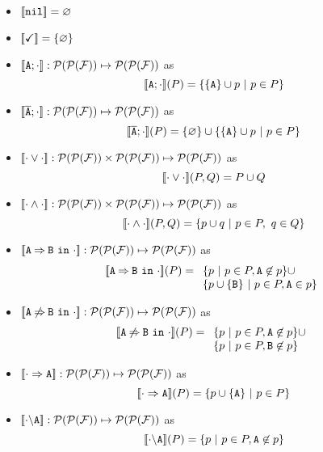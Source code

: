 \begin{itemize}
	\item $[\![\mathtt{nil}]\!]=\varnothing$
	\item $[\![\checkmark]\!]=\{\varnothing\}$
	\item 
	$[\![\mathtt{A};\cdot]\!]:{\cal P}({\cal P}({\cal F}))\mapsto{\cal P}({\cal P}({\cal F}))$
	as
	$$[\![\mathtt{A};\cdot]\!](P)=\{\{\mathtt{A}\}\cup p\ |\ p\in
	P\}$$
	
	\item 
	$[\![\overline{\mathtt{A}};\cdot]\!]:{\cal P}({\cal P}({\cal F}))\mapsto{\cal P}({\cal P}({\cal F}))$
	as
	$$[\![\overline{\mathtt{A}};\cdot]\!](P)=\{\varnothing\}\cup\{\{\mathtt{A}\}\cup p\ |\ p\in
	P\}$$
	
	\item 
	$[\![\cdot\mathbin{\lor}\cdot]\!]:{\cal P}({\cal P}({\cal F}))\times{\cal P}({\cal P}({\cal F}))\mapsto{\cal P}({\cal P}({\cal F}))$
	as 
	$$[\![\cdot\mathbin{\lor}\cdot]\!](P,Q)=P\cup Q$$
	\item 
	$[\![\cdot\mathbin{\wedge}\cdot]\!]:{\cal P}({\cal P}({\cal F}))\times{\cal P}({\cal P}({\cal F}))\mapsto{\cal P}({\cal P}({\cal F}))$
	as 
	$$[\![\cdot\mathbin{\wedge}\cdot]\!](P,Q)=\{ p\cup q\ |\ p\in P,\ q\in Q\}$$
	\item  
	$[\![\mathtt{A}\mathbin{\Rightarrow}\mathtt{B}\ \mathtt{in}\ \cdot]\!]:{\cal P}({\cal P}({\cal F}))\mapsto{\cal P}({\cal P}({\cal F}))$
	as 
	$$[\![\mathtt{A}\mathbin{\Rightarrow}\mathtt{B}\ \mathtt{in}\ \cdot]\!](P)=\begin{array}[t]{l}
	\{p\ |\ p\in P, \mathtt{A}\not\in p\}\cup\\
	\{p\cup\{\mathtt{B}\}\ |\ p\in P, \mathtt{A}\in p\} 
	\end{array}$$
	\item  
	$[\![\mathtt{A}\mathbin{\not\Rightarrow}\mathtt{B}\ \mathtt{in}\ \cdot]\!]:{\cal P}({\cal P}({\cal F}))\mapsto{\cal P}({\cal P}({\cal F}))$
	as 
	$$[\![\mathtt{A}\mathbin{\not\Rightarrow}\mathtt{B}\ \mathtt{in}\ \cdot]\!](P)=\begin{array}[t]{l}
	\{p\ |\ p\in P, \mathtt{A}\not\in p\}\cup\\
	\{p\ |\ p\in P, \mathtt{B}\not\in p\}
	\end{array}$$
	\item $[\![\cdot\Rightarrow\mathtt{A}]\!]:{\cal P}({\cal P}({\cal F}))\mapsto{\cal P}({\cal P}({\cal F}))$
	as 
	$$[\![\cdot\Rightarrow\mathtt{A}]\!](P) = \{p\cup\{\mathtt{A}\}\ |\ p\in P\}$$
	\item   $[\![\cdot\backslash\mathtt{A}]\!]:{\cal P}({\cal P}({\cal F}))\mapsto{\cal P}({\cal P}({\cal F}))$
	as 
	$$\semden{\forbid{A}{\cdot}}(P) = \{p\ |\ p\in P, \feature{A}\not\in p\}$$
\end{itemize}
\edfn


